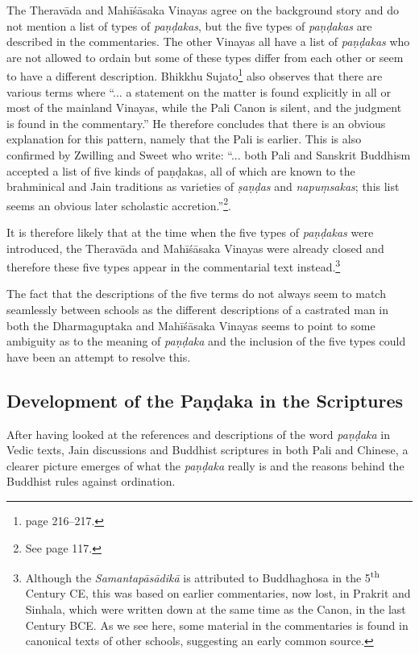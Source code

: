 The Theravāda and Mahīśāsaka Vinayas agree on the background story and do not mention a list of types of {\em paṇḍakas}, but the five types of {\em paṇḍakas} are described in the commentaries. The other Vinayas all have a list of {\em paṇḍakas} who are not allowed to ordain but some of these types differ from each other or seem to have a different description. Bhikkhu Sujato\footnote{\cite{sujato2009} page 216–217.} also observes that there are various terms where ``... a statement on the matter is found explicitly in all or most of the mainland Vinayas, while the Pali Canon is silent, and the judgment is found in the commentary.'' He therefore concludes that there is an obvious explanation for this pattern, namely that the Pali is earlier. This is also confirmed by Zwilling and Sweet who write: ``... both Pali and Sanskrit Buddhism accepted a list of five kinds of paṇḍakas, all of which are known to the brahminical and Jain traditions as varieties of {\em ṣaṇḍas} and {\em napuṃsakas}; this list seems an obvious later scholastic accretion.''\footnote{See \cite{zwilling2000} page 117.}.

It is therefore likely that at the time when the five types of {\em paṇḍakas} were introduced, the Theravāda and Mahīśāsaka Vinayas were already closed and therefore these five types appear in the commentarial text instead.\footnote{Although the {\em Samantapāsādikā} is attributed to Buddhaghosa in the 5\textsuperscript{th} Century CE, this was based on earlier commentaries, now lost, in Prakrit and Sinhala, which were written down at the same time as the Canon, in the last Century BCE. As we see here, some material in the commentaries is found in canonical texts of other schools, suggesting an early common source.} 

The fact that the descriptions of the five terms do not always seem to match seamlessly between schools as the different descriptions of a castrated man in both the Dharmaguptaka and Mahīśāsaka Vinayas seems to point to some ambiguity as to the meaning of {\em paṇḍaka} and the inclusion of the five types could have been an attempt to resolve this.


\subsection{Development of the Paṇḍaka in the Scriptures}
After having looked at the references and descriptions of the word {\em paṇḍaka} in Vedic texts, Jain discussions and Buddhist scriptures in both Pali and Chinese, a clearer picture emerges of what the {\em paṇḍaka} really is and the reasons behind the Buddhist rules against ordination.

